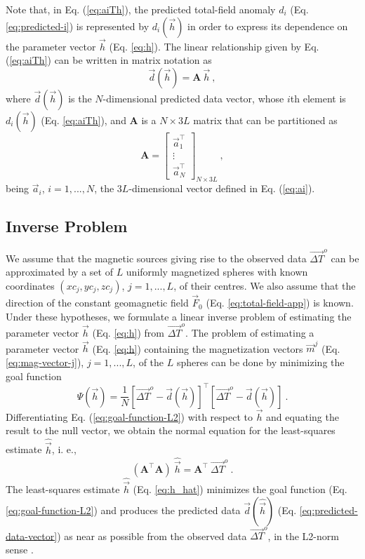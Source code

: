 \documentclass[journal abbreviation, npg]{copernicus}
\begin{document}
Note that, in Eq. (\ref{eq:aiTh}), the predicted total-field anomaly $d_{i}$ (Eq. \ref{eq:predicted-i}) is represented by $d_{i}(\vec{h})$ in order to express its dependence on the parameter vector $\vec{h}$ (Eq. \ref{eq:h}). The linear relationship given by Eq. (\ref{eq:aiTh}) can be written in matrix notation as
\begin{equation}
\vec{d}(\vec{h}) = \mathbf{A} \: \vec{h} \: ,
\label{eq:predicted-data-vector}
\end{equation}
where $\vec{d}(\vec{h})$ is the $N$-dimensional predicted data vector, whose $i$th element is $d_{i}(\vec{h})$ (Eq. \ref{eq:aiTh}), and $\mathbf{A}$ is a $N \times 3L$ matrix that can be partitioned as
\begin{equation}
\mathbf{A} =
\left[
\begin{array}{c}
\vec{a}_{1}^{\intercal} \\
\vdots \\
\vec{a}_{N}^{\intercal}
\end{array}
\right]_{N \times 3L} \: ,
\label{eq:sensibility-matrix}
\end{equation}
being $\vec{a}_{i}$, $i = 1, ..., N$, the $3L$-dimensional vector defined in Eq. (\ref{eq:ai}).

\subsection{Inverse Problem}

We assume that the magnetic sources giving rise to the observed data $\vec{\Delta T}^{o}$ can be approximated by a set of $L$  uniformly magnetized spheres with known coordinates $(xc_{j}, yc_{j}, zc_{j})$, $j = 1, ..., L$, of their centres. We also assume that the direction of the constant geomagnetic field $\vec{F}_{0}$ (Eq. \ref{eq:total-field-app}) is known. Under these hypotheses, we formulate a linear inverse problem of estimating the parameter vector $\vec{h}$ (Eq. \ref{eq:h}) from $\vec{\Delta T}^{o}$. The problem of estimating a parameter vector $\vec{h}$ (Eq. \ref{eq:h}) containing the magnetization vectors $\vec{m}^{j}$ (Eq. \ref{eq:mag-vector-j}), $j = 1, ..., L$, of the $L$ spheres can be done by minimizing the goal function
\begin{equation}
\Psi(\vec{h}) = \frac{1}{N}[\vec{\Delta T}^{o} - \vec{d}(\vec{h})]^{\intercal}[\vec{\Delta T}^{o} - \vec{d}(\vec{h})] \: .
\label{eq:goal-function-L2}
\end{equation}
Differentiating Eq. (\ref{eq:goal-function-L2}) with respect to $\vec{h}$ and equating the result to the null vector, we obtain the normal equation for the least-squares estimate $\hat{\vec{h}}$, i. e.,
\begin{equation}
(\mathbf{A}^{\intercal}\mathbf{A}) \: \hat{\vec{h}} = \mathbf{A}^{\intercal} \: \vec{\Delta T}^{o} \: .
\label{eq:h_hat}
\end{equation}
The least-squares estimate $\hat{\vec{h}}$ (Eq. \ref{eq:h_hat}) minimizes the goal function (Eq. \ref{eq:goal-function-L2}) and produces the predicted data $\vec{d}(\hat{\vec{h}})$ (Eq. \ref{eq:predicted-data-vector}) as near as possible from the observed data $\vec{\Delta T}^{o}$, in the L2-norm sense \citep{bard1973, twomey1977, menke1989, aster-etal2005}.
\end{document}
